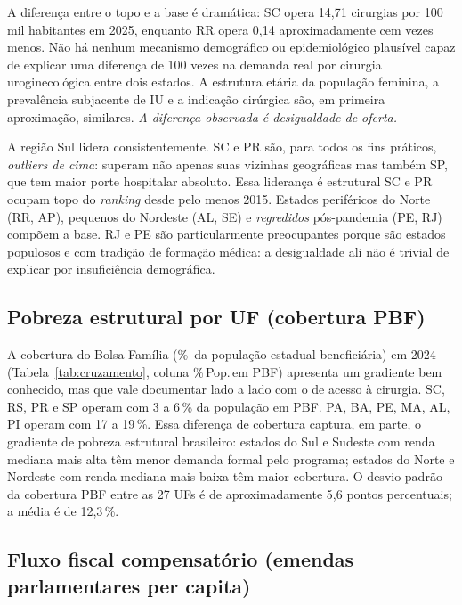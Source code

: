 \documentclass[12pt,a4paper,oneside]{article}
\begin{document}
A diferença entre o topo e a base é dramática: SC opera 14{,}71
cirurgias por 100\,mil habitantes em 2025, enquanto RR opera
0{,}14 \textemdash{} aproximadamente cem vezes menos. Não há
nenhum mecanismo demográfico ou epidemiológico plausível capaz
de explicar uma diferença de 100 vezes na demanda real por
cirurgia uroginecológica entre dois estados. A estrutura etária
da população feminina, a prevalência subjacente de IU e a
indicação cirúrgica são, em primeira aproximação, similares.
\textit{A diferença observada é desigualdade de oferta.}

A região Sul lidera consistentemente. SC e PR são, para todos os
fins práticos, \textit{outliers de cima}: superam não apenas
suas vizinhas geográficas mas também SP, que tem maior porte
hospitalar absoluto. Essa liderança é estrutural \textemdash{}
SC e PR ocupam topo do \textit{ranking} desde pelo menos 2015.
Estados periféricos do Norte (RR, AP), pequenos do Nordeste
(AL, SE) e \textit{regredidos} pós-pandemia (PE, RJ) compõem
a base. RJ e PE são particularmente preocupantes porque são
estados populosos e com tradição de formação médica: a
desigualdade ali não é trivial de explicar por insuficiência
demográfica.

\subsection{Pobreza estrutural por UF (cobertura
PBF)}\label{sub:pobreza}

A cobertura do Bolsa Família (\%~da população estadual
beneficiária) em 2024 (Tabela~\ref{tab:cruzamento},
coluna \%\,Pop.\,em PBF) apresenta um gradiente bem conhecido,
mas que vale documentar lado a lado com o de acesso à cirurgia.
SC, RS, PR e SP operam com 3 a 6\,\% da população em PBF.
PA, BA, PE, MA, AL, PI operam com 17 a 19\,\%. Essa diferença
de cobertura captura, em parte, o gradiente de pobreza
estrutural brasileiro: estados do Sul e Sudeste com renda
mediana mais alta têm menor demanda formal pelo programa;
estados do Norte e Nordeste com renda mediana mais baixa têm
maior cobertura. O desvio padrão da cobertura PBF entre as 27
UFs é de aproximadamente 5{,}6 pontos percentuais; a média é de
12{,}3\,\%.

\subsection{Fluxo fiscal compensatório (emendas
parlamentares per capita)}\label{sub:emendas}
\end{document}
